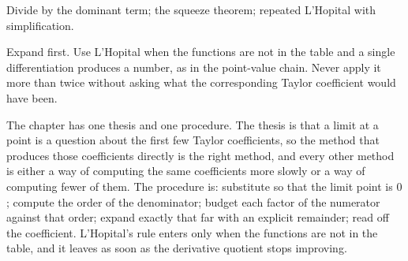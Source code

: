 \begin{seealsob}Divide by the dominant term; the squeeze theorem; repeated L'Hopital with simplification.\end{seealsob}

\begin{keynote}
Expand first. Use L'Hopital when the functions are not in the table and a single differentiation produces a number, as in the point-value chain. Never apply it more than twice without asking what the corresponding Taylor coefficient would have been.
\end{keynote}

The chapter has one thesis and one procedure. The thesis is that a limit at a point is a question about the first few Taylor coefficients, so the method that produces those coefficients directly is the right method, and every other method is either a way of computing the same coefficients more slowly or a way of computing fewer of them. The procedure is: substitute so that the limit point is $0$; compute the order of the denominator; budget each factor of the numerator against that order; expand exactly that far with an explicit remainder; read off the coefficient. L'Hopital's rule enters only when the functions are not in the table, and it leaves as soon as the derivative quotient stops improving.

